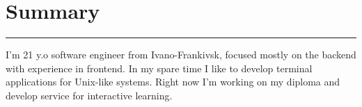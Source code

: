{
    \section*{Summary}
    \par\noindent\rule{\textwidth}{0.1mm}

    {\vspace{0.5cm}}
    I'm 21 y.o software engineer from Ivano-Frankivsk, focused mostly on the backend with experience in frontend.
    In my spare time I like to develop terminal applications for Unix-like systems.
    Right now I'm working on my diploma and develop service for interactive learning.
    \bigbreak
}
